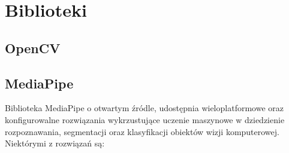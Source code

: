 






\section{Biblioteki}

\subsection{OpenCV}

\subsection{MediaPipe}

\quad Biblioteka MediaPipe o otwartym źródle, udostępnia wieloplatformowe oraz konfigurowalne rozwiązania wykrzustujące uczenie maszynowe w dziedzienie rozpoznawania, segmentacji oraz klasyfikacji obiektów wizji komputerowej. Niektórymi z rozwiązań są:

